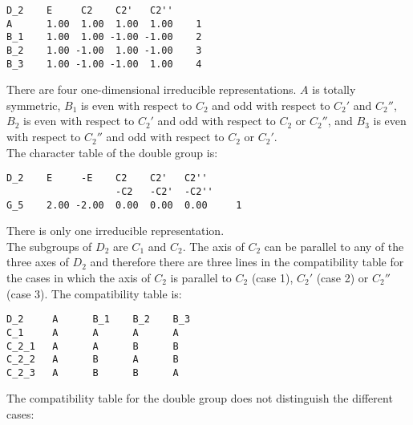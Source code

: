 \documentclass[12pt,a4paper,twoside]{report}
\begin{document}
\begin{tcolorbox}
\begin{footnotesize}
\begin{verbatim}
D_2    E     C2    C2'   C2''
A      1.00  1.00  1.00  1.00    1
B_1    1.00  1.00 -1.00 -1.00    2
B_2    1.00 -1.00  1.00 -1.00    3
B_3    1.00 -1.00 -1.00  1.00    4
\end{verbatim}
\end{footnotesize}
\end{tcolorbox}

There are four one-dimensional irreducible representations.
$A$ is totally symmetric, $B_1$ is even with respect to
$C_2$ and odd with respect to $C_2'$ and $C_2''$, 
$B_2$ is even with respect to $C_2'$ and odd with respect to $C_2$ or $C_2''$,
and $B_3$ is even with respect to $C_2''$ and odd with respect to
$C_2$ or $C_2'$. \\
The character table of the double group is:

\begin{tcolorbox}
\begin{footnotesize}
\begin{verbatim}
D_2    E     -E    C2    C2'   C2'' 
                   -C2   -C2'  -C2''
G_5    2.00 -2.00  0.00  0.00  0.00     1
\end{verbatim}
\end{footnotesize}
\end{tcolorbox}

There is only one irreducible representation. \\
The subgroups of $D_2$ are $C_1$ and $C_2$. The axis of $C_2$ can be parallel to
any of the three axes of $D_2$ and therefore there are three lines in the
compatibility table for the cases in which the axis of $C_2$ is parallel to 
$C_2$ (case 1), $C_2'$ (case 2) or $C_2''$ (case 3). 
The compatibility table is:

\begin{tcolorbox}
\begin{footnotesize}
\begin{verbatim}
D_2     A      B_1    B_2    B_3  
C_1     A      A      A      A   
C_2_1   A      A      B      B     
C_2_2   A      B      A      B   
C_2_3   A      B      B      A
\end{verbatim}
\end{footnotesize}
\end{tcolorbox}

The compatibility table for the double group does not distinguish the different
cases:
\end{document}
